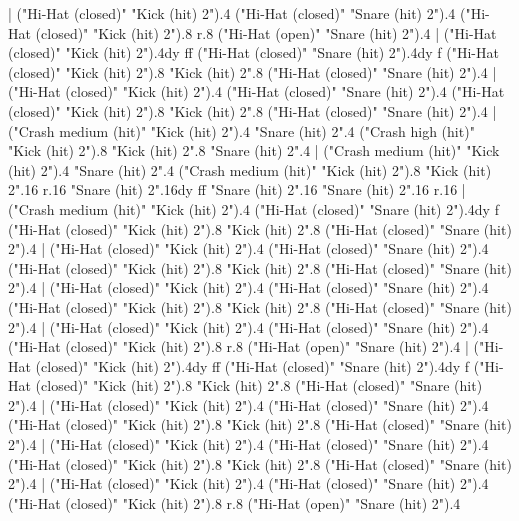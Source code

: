     |
      ("Hi-Hat (closed)" "Kick (hit) 2").4
      ("Hi-Hat (closed)" "Snare (hit) 2").4
      ("Hi-Hat (closed)" "Kick (hit) 2").8
      r.8
      ("Hi-Hat (open)" "Snare (hit) 2").4
    |
      ("Hi-Hat (closed)" "Kick (hit) 2").4{dy ff}
      ("Hi-Hat (closed)" "Snare (hit) 2").4{dy f}
      ("Hi-Hat (closed)" "Kick (hit) 2").8
      "Kick (hit) 2".8
      ("Hi-Hat (closed)" "Snare (hit) 2").4
    |
      ("Hi-Hat (closed)" "Kick (hit) 2").4
      ("Hi-Hat (closed)" "Snare (hit) 2").4
      ("Hi-Hat (closed)" "Kick (hit) 2").8
      "Kick (hit) 2".8
      ("Hi-Hat (closed)" "Snare (hit) 2").4
    |
      ("Crash medium (hit)" "Kick (hit) 2").4
      "Snare (hit) 2".4
      ("Crash high (hit)" "Kick (hit) 2").8
      "Kick (hit) 2".8
      "Snare (hit) 2".4
    |
      ("Crash medium (hit)" "Kick (hit) 2").4
      "Snare (hit) 2".4
      ("Crash medium (hit)" "Kick (hit) 2").8
      "Kick (hit) 2".16
      r.16
      "Snare (hit) 2".16{dy ff}
      "Snare (hit) 2".16
      "Snare (hit) 2".16
      r.16
    |
      ("Crash medium (hit)" "Kick (hit) 2").4
      ("Hi-Hat (closed)" "Snare (hit) 2").4{dy f}
      ("Hi-Hat (closed)" "Kick (hit) 2").8
      "Kick (hit) 2".8
      ("Hi-Hat (closed)" "Snare (hit) 2").4
    |
      ("Hi-Hat (closed)" "Kick (hit) 2").4
      ("Hi-Hat (closed)" "Snare (hit) 2").4
      ("Hi-Hat (closed)" "Kick (hit) 2").8
      "Kick (hit) 2".8
      ("Hi-Hat (closed)" "Snare (hit) 2").4
    |
      ("Hi-Hat (closed)" "Kick (hit) 2").4
      ("Hi-Hat (closed)" "Snare (hit) 2").4
      ("Hi-Hat (closed)" "Kick (hit) 2").8
      "Kick (hit) 2".8
      ("Hi-Hat (closed)" "Snare (hit) 2").4
    |
      ("Hi-Hat (closed)" "Kick (hit) 2").4
      ("Hi-Hat (closed)" "Snare (hit) 2").4
      ("Hi-Hat (closed)" "Kick (hit) 2").8
      r.8
      ("Hi-Hat (open)" "Snare (hit) 2").4
    |
      ("Hi-Hat (closed)" "Kick (hit) 2").4{dy ff}
      ("Hi-Hat (closed)" "Snare (hit) 2").4{dy f}
      ("Hi-Hat (closed)" "Kick (hit) 2").8
      "Kick (hit) 2".8
      ("Hi-Hat (closed)" "Snare (hit) 2").4
    |
      ("Hi-Hat (closed)" "Kick (hit) 2").4
      ("Hi-Hat (closed)" "Snare (hit) 2").4
      ("Hi-Hat (closed)" "Kick (hit) 2").8
      "Kick (hit) 2".8
      ("Hi-Hat (closed)" "Snare (hit) 2").4
    |
      ("Hi-Hat (closed)" "Kick (hit) 2").4
      ("Hi-Hat (closed)" "Snare (hit) 2").4
      ("Hi-Hat (closed)" "Kick (hit) 2").8
      "Kick (hit) 2".8
      ("Hi-Hat (closed)" "Snare (hit) 2").4
    |
      ("Hi-Hat (closed)" "Kick (hit) 2").4
      ("Hi-Hat (closed)" "Snare (hit) 2").4
      ("Hi-Hat (closed)" "Kick (hit) 2").8
      r.8
      ("Hi-Hat (open)" "Snare (hit) 2").4
